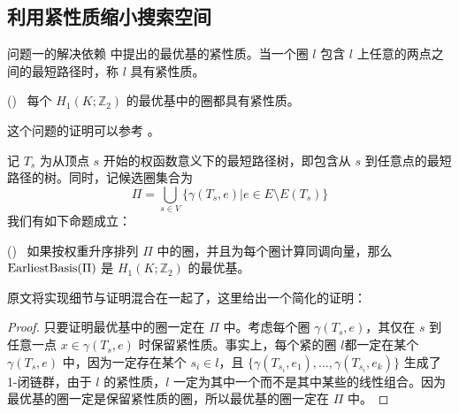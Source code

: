 \subsection{利用紧性质缩小搜索空间}

问题一的解决依赖 \citet{Erickson2005} 中提出的最优基的紧性质。当一个圈 $ l $ 包含 $ l $ 上任意的两点之间的最短路径时，称 $ l $ 具有紧性质。

\begin{proposition}
    (\citet{Busaryev2012})~
    每个 $ H_1(K; \mathbb{Z}_2) $ 的最优基中的圈都具有紧性质。
\end{proposition}
这个问题的证明可以参考 \cite{Busaryev2012}。


记 $ T_s $ 为从顶点 $ s $ 开始的权函数意义下的最短路径树，即包含从 $ s $ 到任意点的最短路径的树。同时，记候选圈集合为
$$
\Pi = \bigcup_{s \in V} \{ \gamma(T_s, e) | e \in E \setminus E(T_s) \}
$$
我们有如下命题成立\cite{Busaryev2012}：
\begin{proposition}
    (\citet{Busaryev2012})~
    如果按权重升序排列 $ \Pi $ 中的圈，并且为每个圈计算同调向量，那么 $ {\rm EarliestBasis}(\Pi) $ 是 $ H_1(K; \mathbb{Z}_2) $ 的最优基。
\end{proposition}
原文\cite{Busaryev2012}将实现细节与证明混合在一起了，这里给出一个简化的证明：
\begin{proof}
    只要证明最优基中的圈一定在 $ \Pi $ 中。考虑每个圈 $ \gamma(T_s, e) $，其仅在 $ s $ 到任意一点 $ x \in \gamma(T_s, e) $ 时保留紧性质。事实上，每个紧的圈 $ l $都一定在某个 $ \gamma(T_s, e) $ 中，因为一定存在某个 $ s_i \in l $，且 $ \{\gamma(T_{s_i}, e_1), \dots, \gamma(T_{s_i}, e_{k})\} $ 生成了 1-闭链群，由于 $ l $ 的紧性质，$ l $ 一定为其中一个而不是其中某些的线性组合。因为最优基的圈一定是保留紧性质的圈，所以最优基的圈一定在 $ \Pi $ 中。
\end{proof}


